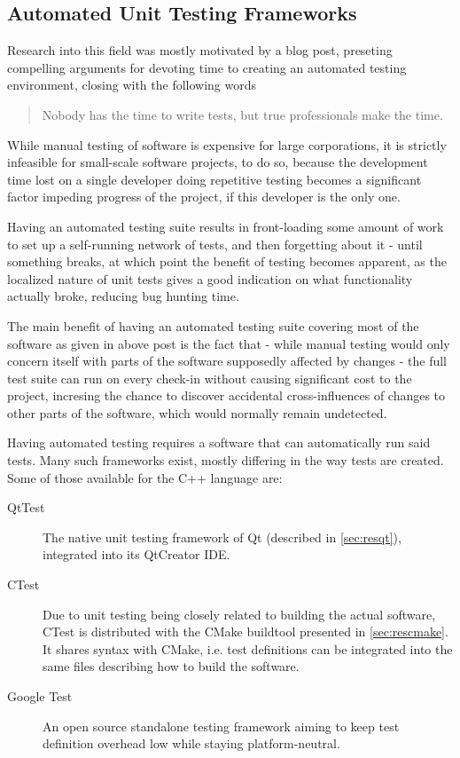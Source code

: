 \subsection{Automated Unit Testing Frameworks}\label{sec:autotest}

Research into this field was mostly motivated by a blog post, preseting compelling arguments for devoting time to creating an automated testing environment, closing with the following words
\begin{quote}
Nobody has the time to write tests, but true professionals make the time. 
\end{quote}

While manual testing of software is expensive for large corporations, it is strictly infeasible for small-scale software projects, to do so, because the development time lost on a single developer doing repetitive testing becomes a significant factor impeding progress of the project, if this developer is the only one. 

Having an automated testing suite results in front-loading some amount of work to set up a self-running network of tests, and then forgetting about it - until something breaks, at which point the benefit of testing becomes apparent, as the localized nature of unit tests gives a good indication on what functionality actually broke, reducing bug hunting time.

The main benefit of having an automated testing suite covering most of the software as given in above post is the fact that - while manual testing would only concern itself with parts of the software supposedly affected by changes - the full test suite can run on every check-in without causing significant cost to the project, incresing the chance to discover accidental cross-influences of changes to other parts of the software, which would normally remain undetected.

Having automated testing requires a software that can automatically run said tests. Many such frameworks exist, mostly differing in the way tests are created. Some of those available for the C++ language are:
\begin{description}
	\item[QtTest] The native unit testing framework of Qt (described in \ref{sec:resqt}), integrated into its QtCreator IDE.
	\item[CTest] Due to unit testing being closely related to building the actual software, CTest is distributed with the CMake buildtool presented in \ref{sec:rescmake}. It shares syntax with CMake, i.e. test definitions can be integrated into the same files describing how to build the software.
	\item[Google Test]  An open source standalone testing framework aiming to keep test definition overhead low while staying platform-neutral.
\end{description}

